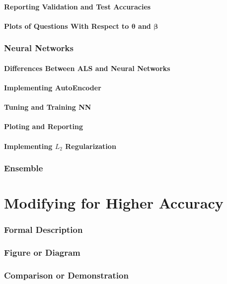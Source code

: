 \documentclass{article}
\begin{document}
    \subsection{Reporting Validation and Test Accuracies}
    \subsection{Plots of Questions With Respect to $\bm{\theta}$ and $\bm{\beta}$}

    \pagebreak

    \section{Neural Networks}
    \subsection{Differences Between ALS and Neural Networks}
    \subsection{Implementing AutoEncoder}
    \subsection{Tuning and Training NN}
    \subsection{Ploting and Reporting}
    \subsection{Implementing $L_2$ Regularization}

    \pagebreak

    \section{Ensemble}

    \pagebreak

    \part{Modifying for Higher Accuracy}
    \section{Formal Description}
    \section{Figure or Diagram}
    \section{Comparison or Demonstration}
\end{document}
